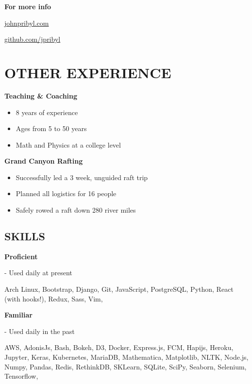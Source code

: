 \documentclass[12pt]{resume}
\begin{document}
\begin{minipage}[t]{0.369\textwidth}
        {\bf For more info}
        \vspace{.7em}
        {\par \textcolor{lavender}{\faGlobe\hspace{.5em}\underline{\href{http://www.johnpribyl.com}{johnpribyl.com}}}}
        {\par \textcolor{lavender}{\faGithub\hspace{.5em}\underline{\href{http://www.github.com/jpribyl}{github.com/jpribyl}}}}

        \vspace{-1em}
        {\section* {OTHER EXPERIENCE}}
        \vspace{.5em}
        {\par \bf Teaching \& Coaching}
        \begin{itemize}
          \setlength\itemsep{-.2em}
          \item {8 years of experience}
          \item {Ages from 5 to 50 years}
          \item {Math and Physics at a college level}
        \end{itemize}
        {\par \bf Grand Canyon Rafting}
        \vspace{-.75em}
        \begin{itemize}
          \setlength\itemsep{-.2em}
          \item {Successfully led a 3 week, unguided raft trip}
          \item {Planned all logistics for 16 people}
          \item {Safely rowed a raft down 280 river miles}
        \end{itemize}
        \begin{tcolorbox}[colback=white]
        \vspace{-.8em}
        {\section* {SKILLS}}
        {\par \bf Proficient} - Used daily at present
        \vspace{.25em}
        \par {
          Arch Linux, Bootstrap, Django, Git, JavaScript, PostgreSQL, Python,
          React (with hooks!), Redux, Sass, Vim,
        }
        \vspace{1em}
        {\par \bf Familiar} - Used daily in the past
        \vspace{.25em}
        \par { 
          AWS, AdonisJs, Bash, Bokeh, D3, Docker, Express.js, FCM,
          Hapijs, Heroku, Jupyter, Keras, Kubernetes, MariaDB,
          Mathematica, Matplotlib, NLTK, Node.js, Numpy, Pandas, Redis,
          RethinkDB, SKLearn, SQLite, SciPy, Seaborn, Selenium,
          Tensorflow, 
        }
        \end{tcolorbox}
    \end{minipage}
\end{document}
